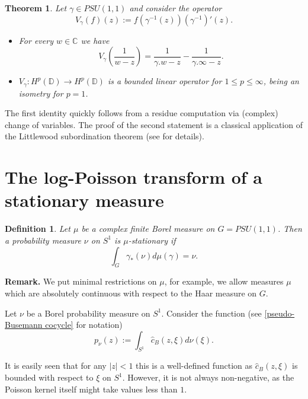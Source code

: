 \documentclass[11pt]{article}
\newtheorem{definition}{Definition}[section]
\newtheorem{theorem}{Theorem}[section]
\begin{document}
\begin{theorem}
	\label{weighted composition ops}
	Let $\gamma \in PSU(1,1)$ and consider the operator
	\[
	V_\gamma(f)(z) := f(\gamma^{-1}(z)) (\gamma^{-1})'(z).
	\] 
	\begin{itemize}
		\item For every $w \in \mathbb{C}$ we have
		\[
		V_\gamma \left( \frac{1}{w - z} \right) = \frac{1}{\gamma.w - z} - \frac{1}{\gamma.\infty - z}.
		\]
		\item $V_\gamma : H^p(\mathbb{D}) \rightarrow H^p(\mathbb{D})$ is a bounded linear operator for $1 \le p \le \infty$, being an isometry for $p = 1$.
	\end{itemize}
\end{theorem}

The first identity quickly follows from a residue computation via (complex) change of variables. The proof of the second statement is a classical application of the Littlewood subordination theorem (see \cite{book:2131218} for details). 

\section{The log-Poisson transform of a stationary measure}
\label{The log-Poisson transform of a stationary measure}
\begin{definition}
	Let $\mu$ be a complex finite Borel measure on $G = PSU(1,1)$. Then a probability measure $\nu$ on $S^1$ is $\mu$-stationary if
	\begin{equation}
		\label{stationary measure}
		\int_G \gamma_*(\nu) d\mu(\gamma) = \nu.
	\end{equation}
\end{definition}

\textbf{Remark.} We put minimal restrictions on $\mu$, for example, we allow measures $\mu$ which are absolutely continuous with respect to the Haar measure on $G$.

Let $\nu$ be a Borel probability measure on $S^1$. Consider the function (see \eqref{pseudo-Busemann cocycle} for notation)
\begin{equation}
	\label{def of the special function}
	p_\nu(z) := \int_{S^1} \hat{c}_B(z, \xi) d \nu(\xi).
\end{equation}

It is easily seen that for any $|z| < 1$ this is a well-defined function as $\hat{c}_B(z, \xi)$ is bounded with respect to $\xi$ on $S^1$. However, it is not always non-negative, as the Poisson kernel itself might take values less than $1$.
\end{document}
